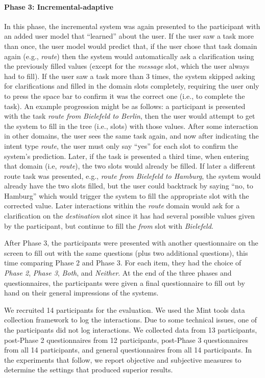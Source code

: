\documentclass[11pt]{article}
\begin{document}
\paragraph{Phase 3: Incremental-adaptive} In this phase, the incremental system was again presented to the participant with an added user model that ``learned'' about the user. If the user saw a task more than once, the user model would predict that, if the user chose that task domain again (e.g., \emph{route}) then the system would automatically ask a clarification using the previously filled values (except for the \emph{message} slot, which the user always had to fill). If the user saw a task more than 3 times, the system skipped asking for clarifications and filled in the domain slots completely, requiring the user only to press the space bar to confirm it was the correct one (i.e., to complete the task). An example progression might be as follows: a participant is presented with the task \emph{route from Bielefeld to Berlin}, then the user would attempt to get the system to fill in the tree (i.e., slots) with those values. After some interaction in other domains, the user sees the same task again, and now after indicating the intent type \emph{route}, the user must only say ``yes'' for each slot to confirm the system's prediction. Later, if the task is presented a third time, when entering that domain (i.e, \emph{route}), the two slots would already be filled. If later a different route task was presented, e.g., \emph{route from Bielefeld to Hamburg}, the system would already have the two slots filled, but the user could backtrack by saying ``no, to Hamburg'' which would trigger the system to fill the appropriate slot with the corrected value. Later interactions within the \emph{route} domain would ask for a clarification on the \emph{destination} slot since it has had several possible values given by the participant, but continue to fill the \emph{from} slot with \emph{Bielefeld}.

After Phase 3, the participants were presented with another questionnaire on the screen to fill out with the same questions (plus two additional questions), this time comparing Phase 2 and Phase 3. For each item, they had the choice of \emph{Phase 2}, \emph{Phase 3}, \emph{Both}, and \emph{Neither}. At the end of the three phases and questionnaires, the participants were given a final questionnaire to fill out by hand on their general impressions of the systems. 

We recruited 14 participants for the evaluation. We used the Mint tools data collection framework \cite{kousidis2012evaluating} to log the interactions. Due to some technical issues, one of the participants did not log interactions. We collected data from 13 participants, post-Phase 2 questionnaires from 12 participants,  post-Phase 3 questionnaires from all 14 participants, and general questionnaires from all 14 participants. In the experiments that follow, we report objective and subjective measures to determine the settings that produced superior results.
\end{document}
